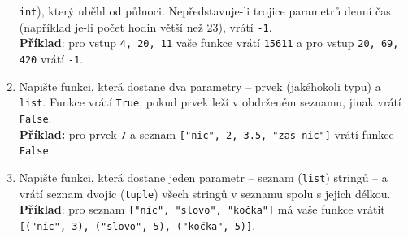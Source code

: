 \documentclass[a4paper,11pt]{article}
\begin{document}
\begin{enumerate}
  \texttt{int}), který uběhl od půlnoci. Nepředstavuje-li trojice parametrů
  denní čas (například je-li počet hodin větší než 23), vrátí \texttt{-1}.\\
  \textbf{Příklad}: pro vstup \texttt{4, 20, 11} vaše funkce vrátí
  \texttt{15611} a pro vstup \texttt{20, 69, 420} vrátí \texttt{-1}.
 \item Napište funkci, která dostane dva parametry -- prvek (jakéhokoli typu) a
  \texttt{list}. Funkce vrátí \texttt{True}, pokud prvek leží v obdrženém
  seznamu, jinak vrátí \texttt{False}.\\
  \textbf{Příklad:} pro prvek \texttt{7} a seznam \texttt{["nic", 2, 3.5, "zas
  nic"]} vrátí funkce \texttt{False}.
 \item Napište funkci, která dostane jeden parametr -- seznam (\texttt{list})
  stringů -- a vrátí seznam dvojic (\texttt{tuple}) všech stringů v seznamu
  spolu s jejich délkou.\\
  \textbf{Příklad}: pro seznam \texttt{["nic", "slovo", "kočka"]} má vaše funkce
  vrátit \texttt{[("nic", 3), ("slovo", 5), ("kočka", 5)]}.
\end{enumerate}
\end{document}
